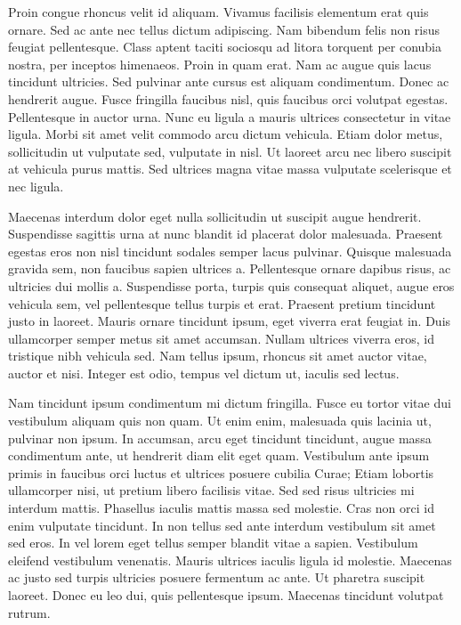 Proin congue rhoncus velit id aliquam.
Vivamus facilisis elementum erat quis ornare.
Sed ac ante nec tellus dictum adipiscing.
Nam bibendum felis non risus feugiat pellentesque.
Class aptent taciti sociosqu ad litora torquent per conubia nostra, per inceptos himenaeos.
Proin in quam erat.
Nam ac augue quis lacus tincidunt ultricies.
Sed pulvinar ante cursus est aliquam condimentum.
Donec ac hendrerit augue.
Fusce fringilla faucibus nisl, quis faucibus orci volutpat egestas.
Pellentesque in auctor urna.
Nunc eu ligula a mauris ultrices consectetur in vitae ligula.
Morbi sit amet velit commodo arcu dictum vehicula.
Etiam dolor metus, sollicitudin ut vulputate sed, vulputate in nisl.
Ut laoreet arcu nec libero suscipit at vehicula purus mattis.
Sed ultrices magna vitae massa vulputate scelerisque et nec ligula.

Maecenas interdum dolor eget nulla sollicitudin ut suscipit augue hendrerit.
Suspendisse sagittis urna at nunc blandit id placerat dolor malesuada.
Praesent egestas eros non nisl tincidunt sodales semper lacus pulvinar.
Quisque malesuada gravida sem, non faucibus sapien ultrices a.
Pellentesque ornare dapibus risus, ac ultricies dui mollis a.
Suspendisse porta, turpis quis consequat aliquet, augue eros vehicula sem, vel pellentesque tellus turpis et erat.
Praesent pretium tincidunt justo in laoreet.
Mauris ornare tincidunt ipsum, eget viverra erat feugiat in.
Duis ullamcorper semper metus sit amet accumsan.
Nullam ultrices viverra eros, id tristique nibh vehicula sed.
Nam tellus ipsum, rhoncus sit amet auctor vitae, auctor et nisi.
Integer est odio, tempus vel dictum ut, iaculis sed lectus.

Nam tincidunt ipsum condimentum mi dictum fringilla.
Fusce eu tortor vitae dui vestibulum aliquam quis non quam.
Ut enim enim, malesuada quis lacinia ut, pulvinar non ipsum.
In accumsan, arcu eget tincidunt tincidunt, augue massa condimentum ante, ut hendrerit diam elit eget quam.
Vestibulum ante ipsum primis in faucibus orci luctus et ultrices posuere cubilia Curae; Etiam lobortis ullamcorper nisi, ut pretium libero facilisis vitae.
Sed sed risus ultricies mi interdum mattis.
Phasellus iaculis mattis massa sed molestie.
Cras non orci id enim vulputate tincidunt.
In non tellus sed ante interdum vestibulum sit amet sed eros.
In vel lorem eget tellus semper blandit vitae a sapien.
Vestibulum eleifend vestibulum venenatis.
Mauris ultrices iaculis ligula id molestie.
Maecenas ac justo sed turpis ultricies posuere fermentum ac ante.
Ut pharetra suscipit laoreet.
Donec eu leo dui, quis pellentesque ipsum.
Maecenas tincidunt volutpat rutrum.

